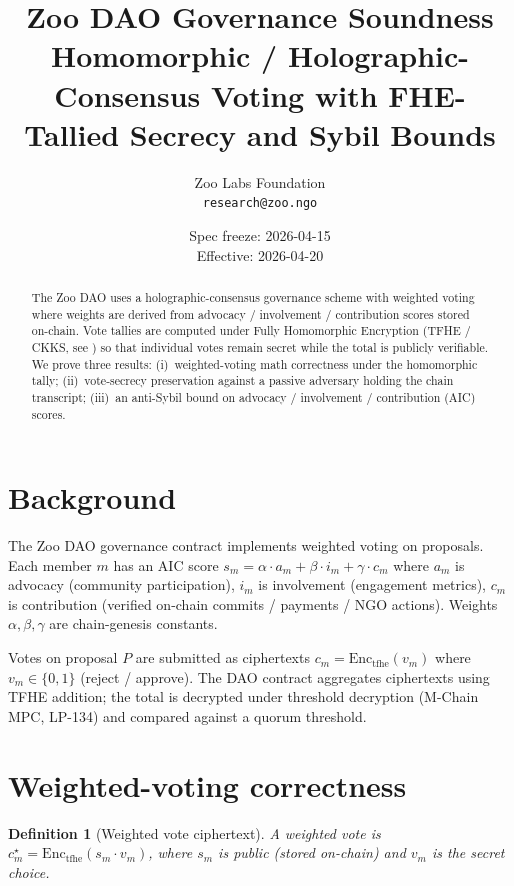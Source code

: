 \documentclass[11pt]{article}
\title{Zoo DAO Governance Soundness\\
{\large Homomorphic / Holographic-Consensus Voting with FHE-Tallied
Secrecy and Sybil Bounds}}
\author{Zoo Labs Foundation\\
\texttt{research@zoo.ngo}}
\date{Spec freeze: 2026-04-15 \\ Effective: 2026-04-20}
\newtheorem{definition}{Definition}
\begin{document}
\maketitle

\begin{abstract}
The Zoo DAO uses a holographic-consensus governance scheme with
weighted voting where weights are derived from advocacy /
involvement / contribution scores stored on-chain. Vote tallies are
computed under Fully Homomorphic Encryption (TFHE / CKKS, see
\cite{lp-fhe}) so that individual votes remain secret while the
total is publicly verifiable. We prove three results:
(i)~weighted-voting math correctness under the homomorphic tally;
(ii)~vote-secrecy preservation against a passive adversary holding
the chain transcript;
(iii)~an anti-Sybil bound on advocacy / involvement / contribution
(AIC) scores.
\end{abstract}

\tableofcontents

\section{Background}
\label{sec:bg}

The Zoo DAO governance contract implements weighted voting on
proposals. Each member $m$ has an AIC score
$s_m = \alpha \cdot a_m + \beta \cdot i_m + \gamma \cdot c_m$
where $a_m$ is advocacy (community participation), $i_m$ is
involvement (engagement metrics), $c_m$ is contribution (verified
on-chain commits / payments / NGO actions). Weights
$\alpha, \beta, \gamma$ are chain-genesis constants.

Votes on proposal $P$ are submitted as ciphertexts
$c_m = \mathrm{Enc}_{\mathrm{tfhe}}(v_m)$ where $v_m \in \{0, 1\}$
(reject / approve). The DAO contract aggregates ciphertexts using
TFHE addition; the total is decrypted under threshold decryption
(M-Chain MPC, LP-134) and compared against a quorum threshold.

\section{Weighted-voting correctness}
\label{sec:weight}

\begin{definition}[Weighted vote ciphertext]
\label{def:wv}
A weighted vote is
$c_m^\star = \mathrm{Enc}_{\mathrm{tfhe}}(s_m \cdot v_m)$, where
$s_m$ is public (stored on-chain) and $v_m$ is the secret choice.
\end{definition}
\end{document}

